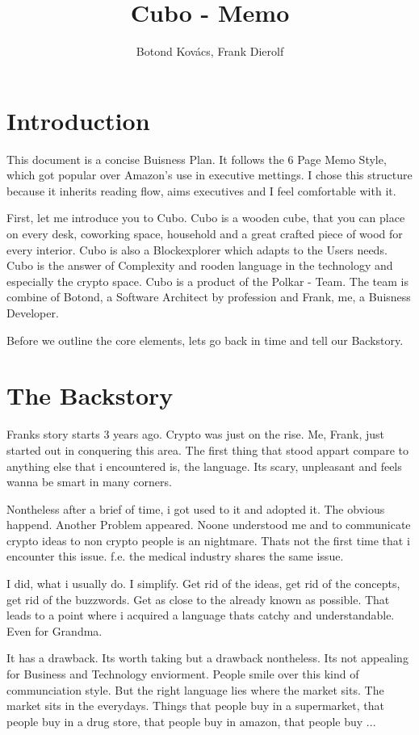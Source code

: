 \documentclass{report}
\title{Cubo - Memo}
\author{Botond Kovács, Frank Dierolf}
\begin{document}
\maketitle

\section{Introduction}

This document is a concise Buisness Plan.
It follows the 6 Page Memo Style, which got popular over Amazon's use in executive mettings.
I chose this structure because it inherits reading flow, aims executives and I feel comfortable with it.

First, let me introduce you to Cubo.
Cubo is a wooden cube, that you can place on every desk, coworking space, household and a great crafted piece of wood for every interior.
Cubo is also a Blockexplorer which adapts to the Users needs.
Cubo is the answer of Complexity and rooden language in the technology and especially the crypto space.
Cubo is a product of the Polkar - Team.
The team is combine of Botond, a Software Architect by profession and Frank, me, a Buisness Developer.

Before we outline the core elements, lets go back in time and tell our Backstory.

\section{The Backstory}
Franks story starts 3 years ago.
Crypto was just on the rise.
Me, Frank, just started out in conquering this area.
The first thing that stood appart compare to anything else that i encountered is, the language.
Its scary, unpleasant and feels wanna be smart in many corners.

Nontheless after a brief of time, i got used to it and adopted it.
The obvious happend. Another Problem appeared.
Noone understood me and to communicate crypto ideas to non crypto people is an nightmare.
Thats not the first time that i encounter this issue.
f.e. the medical industry shares the same issue.

I did, what i usually do. I simplify. Get rid of the ideas, get rid of the concepts, get rid of the buzzwords.
Get as close to the already known as possible. That leads to a point where i acquired a language thats catchy and understandable.
Even for Grandma.

It has a drawback. Its worth taking but a drawback nontheless.
Its not appealing for Business and Technology enviorment. People smile over this kind of communciation style.
But the right language lies where the market sits. The market sits in the everydays.
Things that people  buy in a supermarket, that people buy in a drug store, that people buy in amazon, that people buy ...
\end{document}
